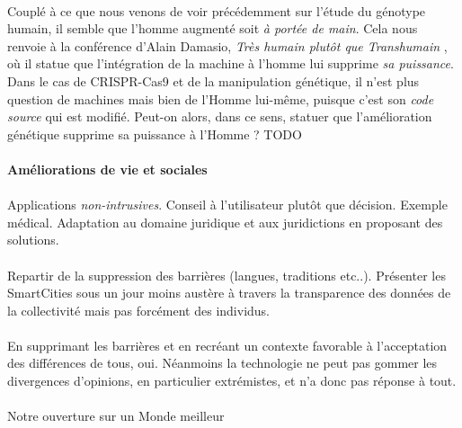 \paragraph{} Couplé à ce que nous venons de voir précédemment sur l'étude du génotype humain, il semble que
l'homme augmenté soit \emph{à portée de main}. Cela nous renvoie à la conférence d'Alain Damasio, \emph{Très humain
plutôt que Transhumain} \cite{Damasio2}, où il statue que l'intégration de la machine à l'homme lui supprime \emph{
sa puissance}. Dans le cas de CRISPR-Cas9 et de la manipulation génétique, il n'est plus question de machines
mais bien de l'Homme lui-même, puisque c'est son \emph{code source} qui est modifié. Peut-on alors, dans ce sens,
statuer que l'amélioration génétique supprime sa puissance à l'Homme ? TODO

\paragraph{Améliorations de vie et sociales}

\paragraph{} Applications \emph{non-intrusives}. Conseil à l'utilisateur plutôt que décision. Exemple médical.
Adaptation au domaine juridique et aux juridictions en proposant des solutions.

\paragraph{} Repartir de la suppression des barrières (langues, traditions etc..). Présenter les SmartCities sous
un jour moins austère à travers la transparence des données de la collectivité mais pas forcément des individus.

\paragraph{} En supprimant les barrières et en recréant un contexte favorable à l'acceptation des différences de tous,
oui. Néanmoins la technologie ne peut pas gommer les divergences d'opinions, en particulier extrémistes, et n'a donc
pas réponse à tout.

\paragraph{} Notre ouverture sur un Monde meilleur

